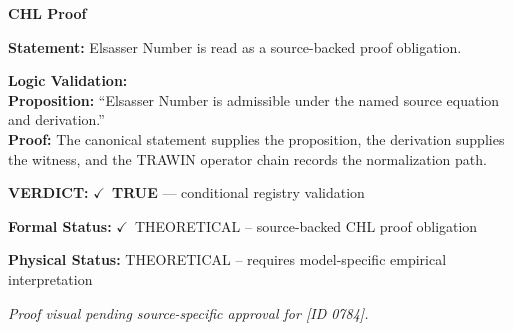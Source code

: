 \vspace{0.45em}
\noindent\textbf{CHL Proof}\par
\textbf{Statement:} Elsasser Number is read as a source-backed proof obligation.

\textbf{Logic Validation:}\\
\textbf{Proposition:} ``Elsasser Number is admissible under the named source equation and derivation.''\\
\textbf{Proof:} The canonical statement supplies the proposition, the derivation supplies the witness, and the TRAWIN operator chain records the normalization path.

\textbf{VERDICT:} \ensuremath{\checkmark}\ \textbf{TRUE} --- conditional registry validation

\textbf{Formal Status:} \ensuremath{\checkmark}\ THEORETICAL -- source-backed CHL proof obligation

\textbf{Physical Status:} THEORETICAL -- requires model-specific empirical interpretation
\par\vspace{0.45em}
\par
\vfill
\begingroup\footnotesize\itshape
Proof visual pending source-specific approval for [ID 0784].
\par\endgroup
\vfill
\endgroup
\endgroup
